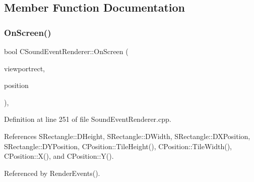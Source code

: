 \subsection{Member Function Documentation}
\hypertarget{classCSoundEventRenderer_a9df97d476a3a39cb7126db9c366c2f0c}{}\label{classCSoundEventRenderer_a9df97d476a3a39cb7126db9c366c2f0c} 
\subsubsection{\texorpdfstring{On\+Screen()}{OnScreen()}}
{\footnotesize\ttfamily bool C\+Sound\+Event\+Renderer\+::\+On\+Screen (\begin{DoxyParamCaption}\item[{const \hyperlink{structSRectangle}{S\+Rectangle} \&}]{viewportrect,  }\item[{const \hyperlink{classCPosition}{C\+Position} \&}]{position }\end{DoxyParamCaption})\hspace{0.3cm}{\ttfamily [static]}, {\ttfamily [protected]}}



Definition at line 251 of file Sound\+Event\+Renderer.\+cpp.



References S\+Rectangle\+::\+D\+Height, S\+Rectangle\+::\+D\+Width, S\+Rectangle\+::\+D\+X\+Position, S\+Rectangle\+::\+D\+Y\+Position, C\+Position\+::\+Tile\+Height(), C\+Position\+::\+Tile\+Width(), C\+Position\+::\+X(), and C\+Position\+::\+Y().



Referenced by Render\+Events().



